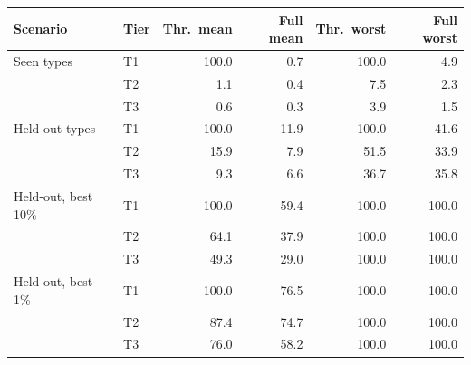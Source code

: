 \begin{tabular}{@{}llrrrr@{}}
\toprule
Scenario & Tier & Thr.\ mean & Full mean & Thr.\ worst & Full worst \\
\midrule
Seen types & T1 & 100.0 & 0.7 & 100.0 & 4.9 \\
 & T2 & 1.1 & 0.4 & 7.5 & 2.3 \\
 & T3 & 0.6 & 0.3 & 3.9 & 1.5 \\
\midrule
Held-out types & T1 & 100.0 & 11.9 & 100.0 & 41.6 \\
 & T2 & 15.9 & 7.9 & 51.5 & 33.9 \\
 & T3 & 9.3 & 6.6 & 36.7 & 35.8 \\
\midrule
Held-out, best 10\% & T1 & 100.0 & 59.4 & 100.0 & 100.0 \\
 & T2 & 64.1 & 37.9 & 100.0 & 100.0 \\
 & T3 & 49.3 & 29.0 & 100.0 & 100.0 \\
\midrule
Held-out, best 1\% & T1 & 100.0 & 76.5 & 100.0 & 100.0 \\
 & T2 & 87.4 & 74.7 & 100.0 & 100.0 \\
 & T3 & 76.0 & 58.2 & 100.0 & 100.0 \\
\bottomrule
\end{tabular}